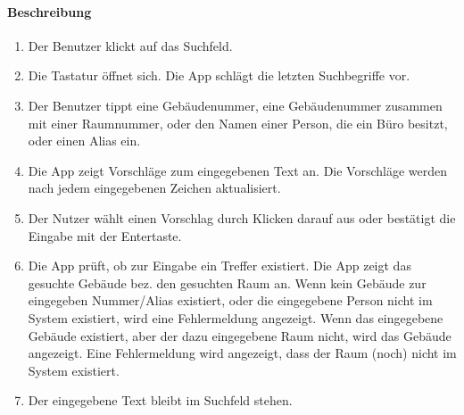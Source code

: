 \paragraph{Beschreibung}
\begin{enumerate}
    \item Der Benutzer klickt auf das Suchfeld.
    \item Die Tastatur öffnet sich. Die App schlägt die letzten Suchbegriffe vor.
    \item Der Benutzer tippt eine Gebäudenummer, eine Gebäudenummer zusammen mit einer Raumnummer, oder den Namen einer Person, die ein Büro besitzt, oder einen Alias ein.
    \item Die App zeigt Vorschläge zum eingegebenen Text an. Die Vorschläge werden nach jedem eingegebenen Zeichen aktualisiert.
    \item Der Nutzer wählt einen Vorschlag durch Klicken darauf aus oder bestätigt die Eingabe mit der Entertaste.
    \item Die App prüft, ob zur Eingabe ein Treffer existiert.
     Die App zeigt das gesuchte Gebäude bez. den gesuchten Raum an.
    \subsubitem Wenn kein Gebäude zur eingegeben Nummer/Alias existiert, oder die eingegebene Person nicht im System existiert, wird eine Fehlermeldung angezeigt.
    \subsubitem Wenn das eingegebene Gebäude existiert, aber der dazu eingegebene Raum nicht, wird das Gebäude angezeigt. Eine Fehlermeldung wird angezeigt, dass der Raum (noch) nicht im System existiert.
    \item Der eingegebene Text bleibt im Suchfeld stehen.
\end{enumerate}